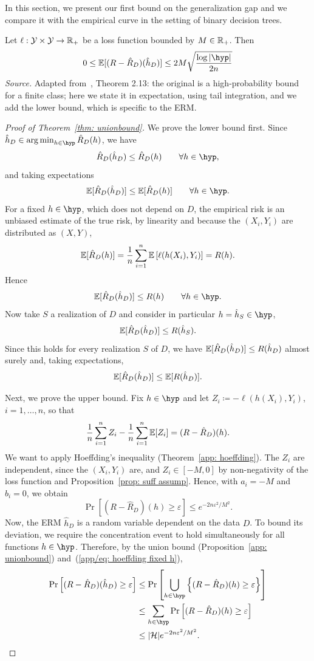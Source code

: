 \documentclass[reqno]{amsart}
\begin{document}
In this section, we present our first bound on the generalization gap and we compare it with the empirical curve in the setting of binary decision trees.

\begin{theorem}\label{thm: unionbound} Let $\ell:\mathcal{Y}\times\mathcal{Y}\to\mathbb{R}_+$ be a loss function bounded by $M\in\mathbb{R}_+$. Then
\[                
  0 \le \expv[(R - \hat R_D)(\hat h_D)] \le 2M\sqrt{\frac{\log \vert \hyp \vert}{2n}}
\]
\textnormal{\emph{Source.} Adapted from~\cite{mohri2018foundations}, Theorem 2.13: the original is a high-probability bound for a finite class; here we state it in expectation, using tail integration, and we add the lower bound, which is specific to the ERM.}

\begin{proof}[Proof of Theorem~\ref{thm: unionbound}]
We prove the lower bound first. Since $\hat h_D \in \argmin_{h\in\hyp} \hat R_D(h)$, we have
\[
\hat R_D(\hat h_D) \le \hat R_D(h) \qquad \forall h\in\hyp,
\]
and taking expectations
\[
\expv[\hat R_D(\hat h_D)] \le \expv[\hat R_D(h)] \qquad \forall h\in\hyp.
\]
For a fixed $h\in\hyp$, which does not depend on $D$, the empirical risk is an unbiased estimate of the true risk, by linearity and because the $(X_i,Y_i)$ are distributed as $(X,Y)$,
\[
\mathbb{E}[\hat R_D(h)] = \frac1n\sum_{i=1}^n \mathbb{E}\left[\ell(h(X_i),Y_i)\right] = R(h).
\]
Hence
\[
\expv[\hat R_D(\hat h_D)] \le R(h) \qquad \forall h\in\hyp.
\]
Now take $S$ a realization of $D$ and consider in particular $h=\hat h_{S}\in\hyp$,
\[
\mathbb{E}[\hat R_D(\hat h_D)] \le R(\hat h_{S}).
\]
Since this holds for every realization $S$ of $D$, we have $\mathbb{E}[\hat R_D(\hat h_D)] \le R(\hat h_D)$ almost surely and, taking expectations,
\[
\mathbb{E}[\hat R_D(\hat h_D)] \le \mathbb{E}[R(\hat h_D)].
\]

Next, we prove the upper bound. Fix $h\in\hyp$ and let $Z_i \coloneq -\ell(h(X_i),Y_i)$, $i=1,\ldots,n$, so that
\[
\frac1n\sum_{i=1}^n Z_i - \frac1n\sum_{i=1}^n \mathbb{E}[Z_i] = (R - \hat R_D)(h).
\]
We want to apply Hoeffding's inequality (Theorem~\ref{app: hoeffding}). The $Z_i$ are independent, since the $(X_i,Y_i)$ are, and $Z_i\in[-M,0]$ by non-negativity of the loss function and Proposition~\ref{prop: suff assump}. Hence, with $a_i = -M$ and $b_i = 0$, we obtain
\begin{equation}\label{app/eq: hoeffding fixed h}
\Pr\left[(R - \hat R_D)(h) \ge \varepsilon\right] \le e^{-2n\varepsilon^2/M^2}.
\end{equation}
Now, the ERM $\hat{h}_D$ is a random variable dependent on the data $D$. To bound its deviation, we require the concentration event to hold simultaneously for all functions $h \in \hyp$. Therefore, by the union bound (Proposition~\ref{app: unionbound}) and~(\ref{app/eq: hoeffding fixed h}),
\begin{align}\label{app/eq: unionbound prob}
\Pr\left[(R-\hat R_D)(\hat h_D) \ge \varepsilon\right] &\le \Pr\left[\bigcup_{h\in\hyp}\left\{(R - \hat R_D)(h)\ge\varepsilon\right\}\right] \notag \\
&\le \sum_{h\in\hyp} \Pr\left[(R - \hat R_D)(h)\ge \varepsilon\right] \notag \\
&\le \card e^{-2n\varepsilon^2/M^2}.
\end{align}


\end{proof}
\end{theorem}
\end{document}
